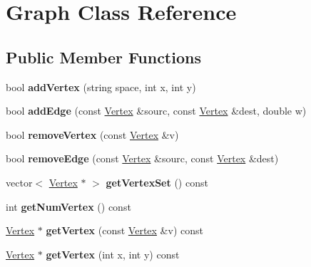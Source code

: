 \hypertarget{class_graph}{\section{Graph Class Reference}
\label{class_graph}
}
\subsection*{Public Member Functions}
\begin{DoxyCompactItemize}
\item 
\hypertarget{class_graph_a37cfcb7d3c10ae10ef0bf98a7ff72ac8}{bool {\bfseries add\-Vertex} (string space, int x, int y)}\label{class_graph_a37cfcb7d3c10ae10ef0bf98a7ff72ac8}

\item 
\hypertarget{class_graph_aedea6f9bbe41b0dccc1a3b7ab1c2b9fa}{bool {\bfseries add\-Edge} (const \hyperlink{class_vertex}{Vertex} \&sourc, const \hyperlink{class_vertex}{Vertex} \&dest, double w)}\label{class_graph_aedea6f9bbe41b0dccc1a3b7ab1c2b9fa}

\item 
\hypertarget{class_graph_a58fb666730cc5d6264eabb4ae06e9556}{bool {\bfseries remove\-Vertex} (const \hyperlink{class_vertex}{Vertex} \&v)}\label{class_graph_a58fb666730cc5d6264eabb4ae06e9556}

\item 
\hypertarget{class_graph_a00c66cfb44847dd4913e18c2023899e2}{bool {\bfseries remove\-Edge} (const \hyperlink{class_vertex}{Vertex} \&sourc, const \hyperlink{class_vertex}{Vertex} \&dest)}\label{class_graph_a00c66cfb44847dd4913e18c2023899e2}

\item 
\hypertarget{class_graph_a28037aa625ed3b4697cac7c5da80bc0b}{vector$<$ \hyperlink{class_vertex}{Vertex} $\ast$ $>$ {\bfseries get\-Vertex\-Set} () const }\label{class_graph_a28037aa625ed3b4697cac7c5da80bc0b}

\item 
\hypertarget{class_graph_a74d463ee71d33c39b05602fbca6dbdbc}{int {\bfseries get\-Num\-Vertex} () const }\label{class_graph_a74d463ee71d33c39b05602fbca6dbdbc}

\item 
\hypertarget{class_graph_a8c54e3cf9367b3882f5348ee8dfb86ca}{\hyperlink{class_vertex}{Vertex} $\ast$ {\bfseries get\-Vertex} (const \hyperlink{class_vertex}{Vertex} \&v) const }\label{class_graph_a8c54e3cf9367b3882f5348ee8dfb86ca}

\item 
\hypertarget{class_graph_a3bf23feb5d45968cd33b4bc6308c2919}{\hyperlink{class_vertex}{Vertex} $\ast$ {\bfseries get\-Vertex} (int x, int y) const }\label{class_graph_a3bf23feb5d45968cd33b4bc6308c2919}


\end{DoxyCompactItemize}
